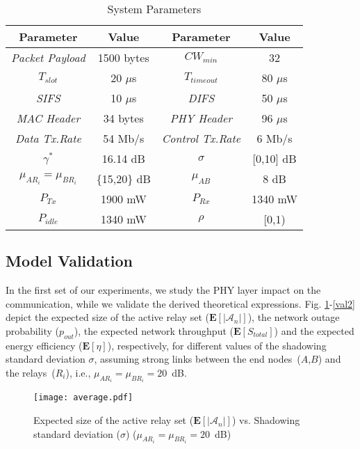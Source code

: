 \documentclass[12pt,draftcls, onecolumn]{IEEEtran}
\begin{document}
\begin{table}[htb]
\caption{System Parameters} \label{t2}
\begin{center}
\begin{tabular}{|c|c||c|c|}
\hline
\textbf{Parameter} & \textbf{Value} & \textbf{Parameter} & \textbf{Value} \\ \hline
\textit{Packet Payload} & 1500 bytes & \textit{$CW_{min}$} & 32\\ \hline
\textit{$T_{slot}$} & 20 $\mu$s & \textit{$T_{timeout}$} & 80 $\mu$s \\ \hline
\textit{SIFS} & 10 $\mu$s & \textit{DIFS} & 50 $\mu$s\\ \hline
\textit{MAC Header} & 34 bytes & \textit{PHY Header} & 96 $\mu$s \\ \hline
\textit{Data Tx.Rate} & 54 Mb/s & \textit{Control Tx.Rate} & 6 Mb/s \\ \hline
$\gamma^*$ & 16.14 dB & $\sigma$ & [0,10] dB\\ \hline
$\mu_{AR_i}=\mu_{BR_i}$ & \{15,20\} dB & $\mu_{AB}$ & 8 dB\\ \hline
\textit{$P_{Tx}$} & 1900 mW & \textit{$P_{Rx}$} & 1340 mW \\ \hline
\textit{$P_{idle}$} & 1340 mW & $\rho$ & [0,1) \\ \hline
 \end{tabular}
\end{center}
\end{table}

\subsection{Model Validation}
\label{sec:validation}

In the first set of our experiments, we study the PHY layer impact on the communication, while we validate the derived theoretical expressions. Fig. \ref{phyf1}-\ref{val2} depict the expected size of the active relay set ($\mathbf{E}[|\mathcal{A}_n|]$), the network outage probability ($p_{out}$), the expected network throughput ($\mathbf{E}[S_{total}]$) and the expected energy efficiency ($\mathbf{E}[\eta]$), respectively, for different values of the shadowing standard deviation $\sigma$, assuming strong links between the end nodes~($A$,$B$) and the relays~($R_i$), i.e., $\mu_{AR_i}=\mu_{BR_i}=20$~dB.

\begin{figure}[htb]
\centering
\texttt{[image: average.pdf]}
\caption{Expected size of the active relay set ($\mathbf{E}[|\mathcal{A}_n|]$) vs. Shadowing standard deviation ($\sigma$) ($\mu_{AR_i}=\mu_{BR_i}=20$~dB)}\label{phyf1}
\end{figure}
\end{document}
